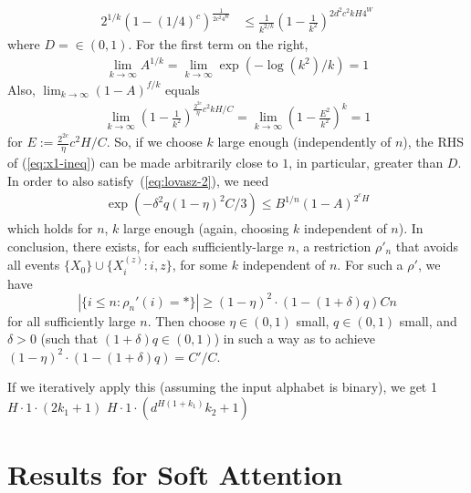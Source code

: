 \documentclass[11pt,a4paper]{article}
\begin{document}
\begin{align}
   2^{1/k} \left(1-(1/4)^c\right)^{\frac{1}{2c^2 4^W}} &\leq \frac{1}{k^{2/k}} (1-\frac{1}{k^2})^{2 d^2 c^2kH 4^W}
\end{align}
where $D =   \in (0,1)$.
For the first term on the right, 
\begin{align*}
\lim_{k\rightarrow \infty} A^{1/k} = \lim_{k\rightarrow \infty} \exp\left(-\log(k^2) / k\right) = 1
\end{align*}
Also, $\lim_{k\rightarrow \infty} (1-A)^{f/k}$ equals
\begin{align*}
\lim_{k\rightarrow \infty} \left(1-\frac{1}{k^2}\right)^{\frac{2^{2c}}{\eta}c^2kH/C} = \lim_{k\rightarrow \infty} \left(1-\frac{E^2}{k^2}\right)^{k} = 1
\end{align*}
for $E := \frac{2^{2c}}{\eta}c^2H/C$. So, if we choose $k$ large enough (independently of $n$), the RHS of (\ref{eq:x1-ineq}) can be made arbitrarily close to $1$, in particular, greater than $D$.
In order to also satisfy~(\ref{eq:lovasz-2}), we need
\begin{align*}
\exp\left(-\delta^2q(1-\eta)^2C/3\right)  \leq B^{1/n} (1-A)^{2^c H}
\end{align*}
which holds for $n$, $k$ large enough (again, choosing $k$ independent of $n$). 
In conclusion, there exists, for each sufficiently-large $n$, a restriction $\rho'_n$ that avoids all events $\{X_0\} \cup \{X_i^{(z)} : i, z\}$, for some $k$ independent of $n$.
For such a $\rho'$, we have
\begin{equation*}
|\{i \leq n: \rho_n'(i) = *\}|\geq (1-\eta)^2\cdot (1-(1+\delta)q) C n
\end{equation*}
for all sufficiently large $n$.
Then choose $\eta \in (0,1)$ small, $q \in (0,1)$ small, and $\delta >0$ (such that $(1+\delta)q \in (0,1)$) in such a way as to achieve $(1-\eta)^2\cdot (1-(1+\delta)q) = C'/C$.



If we iteratively apply this (assuming the input alphabet is binary), we get 
1
$H\cdot 1\cdot(2 k_1+1)$
$H\cdot 1\cdot(d^{H(1+k_1)}k_2+1)$




\section{Results for Soft Attention}\label{sec:soft}
\end{document}

